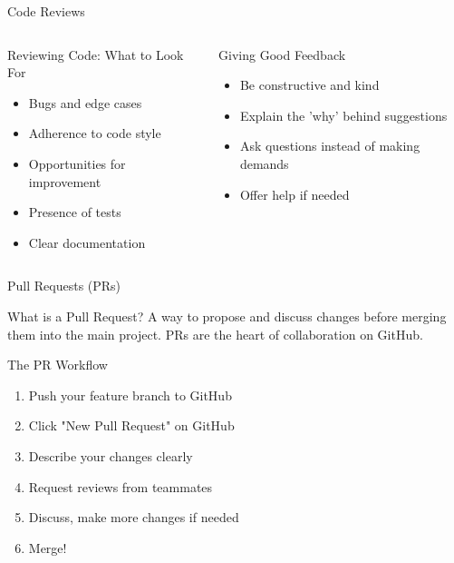 \documentclass[aspectratio=169]{beamer}
\begin{document}
\begin{frame}{Code Reviews}
  \begin{columns}
    \begin{column}{0.48\textwidth}
      \begin{block}{Reviewing Code: What to Look For}
        \begin{itemize}
          \item Bugs and edge cases
          \item Adherence to code style
          \item Opportunities for improvement
          \item Presence of tests
          \item Clear documentation
        \end{itemize}
      \end{block}
    \end{column}

    \begin{column}{0.48\textwidth}
      \begin{exampleblock}{Giving Good Feedback}
        \begin{itemize}
          \item Be constructive and kind
          \item Explain the 'why' behind suggestions
          \item Ask questions instead of making demands
          \item Offer help if needed
        \end{itemize}
      \end{exampleblock}
    \end{column}
  \end{columns}
\end{frame}

\begin{frame}{Pull Requests (PRs)}
  \begin{block}{What is a Pull Request?}
    A way to propose and discuss changes before merging them into the main project. PRs are the heart of collaboration on GitHub.
  \end{block}

      \begin{block}{The PR Workflow}
        \begin{enumerate}
          \item Push your feature branch to GitHub
          \item Click "New Pull Request" on GitHub
          \item Describe your changes clearly
          \item Request reviews from teammates
          \item Discuss, make more changes if needed
          \item Merge!
        \end{enumerate}
      \end{block}
   
\end{frame}
\end{document}
